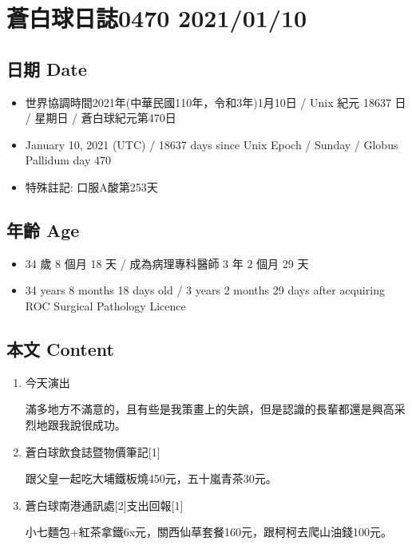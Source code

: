 \documentclass[
]{article}
\providecommand{\tightlist}{%
  \setlength{\itemsep}{0pt}\setlength{\parskip}{0pt}}
\begin{document}
\hypertarget{ux84bcux767dux7403ux65e5ux8a8c0470-20210110}{%
\section{蒼白球日誌0470
2021/01/10}\label{ux84bcux767dux7403ux65e5ux8a8c0470-20210110}}

\hypertarget{ux65e5ux671f-date-9}{%
\subsection{日期 Date}\label{ux65e5ux671f-date-9}}

\begin{itemize}
\tightlist
\item
  世界協調時間2021年(中華民國110年，令和3年)1月10日 / Unix 紀元 18637 日
  / 星期日 / 蒼白球紀元第470日
\item
  January 10, 2021 (UTC) / 18637 days since Unix Epoch / Sunday / Globus
  Pallidum day 470
\item
  特殊註記: 口服A酸第253天
\end{itemize}

\hypertarget{ux5e74ux9f61-age-9}{%
\subsection{年齡 Age}\label{ux5e74ux9f61-age-9}}

\begin{itemize}
\tightlist
\item
  34 歲 8 個月 18 天 / 成為病理專科醫師 3 年 2 個月 29 天
\item
  34 years 8 months 18 days old / 3 years 2 months 29 days after
  acquiring ROC Surgical Pathology Licence
\end{itemize}

\hypertarget{ux672cux6587-content-9}{%
\subsection{本文 Content}\label{ux672cux6587-content-9}}

\begin{enumerate}
\def\labelenumi{\arabic{enumi}.}
\item
  今天演出

  滿多地方不滿意的，且有些是我策畫上的失誤，但是認識的長輩都還是興高采烈地跟我說很成功。
\item
  蒼白球飲食誌暨物價筆記{[}1{]}

  跟父皇一起吃大埔鐵板燒450元，五十嵐青茶30元。
\item
  蒼白球南港通訊處{[}2{]}支出回報{[}1{]}

  小七麵包+紅茶拿鐵6x元，關西仙草套餐160元，跟柯柯去爬山油錢100元。
\end{enumerate}
\end{document}
